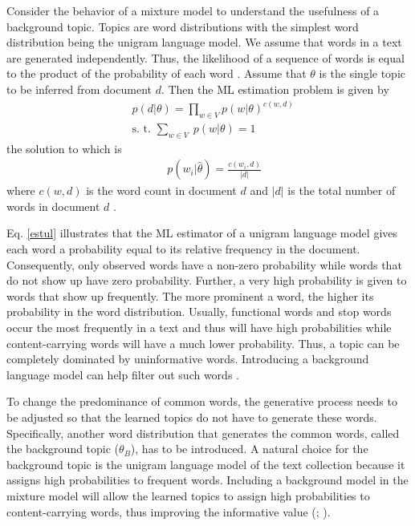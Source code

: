 \documentclass[11pt,a4paper,english,oneside]{book}
\numberwithin{equation}{chapter}
\begin{document}
Consider the behavior of a mixture model to understand the usefulness of a background topic. Topics are word distributions with the simplest word distribution being the unigram language model. We assume that words in a text are generated independently. Thus, the likelihood of a sequence of words is equal to the product of the probability of each word \citep[pp. 51--54]{Zhai.2016}. Assume that $\theta$ is the single topic to be inferred from document $d$. Then the ML estimation problem is given by
\begin{align}
\label{ul} & p(d|\theta) = \underset{w \in V}\prod p(w|\theta)^{c(w,d)}\\
\label{constraintsul} & \text{s. t. } \underset{w \in V}{\sum} \ p(w|\theta) = 1
\end{align}
the solution to which is
\begin{align}
\label{estul} & \ p(w_i|\hat{\theta}) = \frac{c(w_i,d)}{|d|}
\end{align}
where $c(w,d)$ is the word count in document $d$ and $|d|$ is the total number of words in document $d$ \citep[pp. 341-343]{Zhai.2016}. 

Eq. \ref{estul} illustrates that the ML estimator of a unigram language model gives each word a probability equal to its relative frequency in the document. Consequently, only observed words have a non-zero probability while words that do not show up have zero probability. Further, a very high probability is given to words that show up frequently. The more prominent a word, the higher its probability in the word distribution. 
Usually, functional words and stop words occur the most frequently in a text and thus will have high probabilities while content-carrying words will have a much lower probability. Thus, a topic can be completely dominated by uninformative words. Introducing a background language model can help filter out such words \citep[pp. 51--54]{Zhai.2016}.  

To change the predominance of common words, the generative process needs to be adjusted so that the learned topics do not have to generate these words. Specifically, another word distribution that generates the common words, called the background topic ($\theta_B$), has to be introduced. A natural choice for the background topic is the unigram language model of the text collection because it assigns high probabilities to frequent words. Including a background model in the mixture model will allow the learned topics to assign high probabilities to content-carrying words, thus improving the informative value (\citealp[pp.7--8]{Darling.2011}; \citealp{Chem.2007}).  
\end{document}
